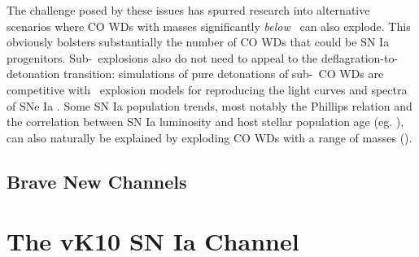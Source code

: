 

The challenge posed by these issues has spurred research into alternative scenarios where CO WDs with masses significantly \textit{below} \Mch\ can also explode.  This obviously bolsters substantially the number of CO WDs that could be SN Ia progenitors.  Sub-\Mch\ explosions also do not need to appeal to the deflagration-to-detonation transition: simulations of pure detonations of sub-\Mch\ CO WDs \citep{shig+92, sim+10} are competitive with \Mch\ explosion models for reproducing the light curves and spectra of SNe Ia \citep{none}.  Some SN Ia population trends, most notably the Phillips relation and the correlation between SN Ia luminosity and host stellar population age (eg. \cite{none}), can also naturally be explained by exploding CO WDs with a range of masses (\citeal{vkercj10}).

\subsection{Brave New Channels}

\section{The vK10 SN Ia Channel}


